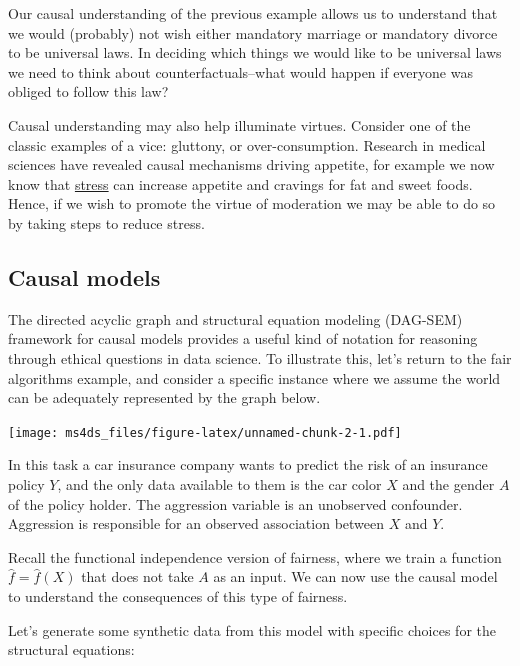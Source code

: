 \documentclass[]{book}
\theoremstyle{definition}
\theoremstyle{definition}
\theoremstyle{definition}
\theoremstyle{remark}
\begin{document}
Our causal understanding of the previous example allows us to understand
that we would (probably) not wish either mandatory marriage or mandatory
divorce to be universal laws. In deciding which things we would like to
be universal laws we need to think about counterfactuals--what would
happen if everyone was obliged to follow this law?

Causal understanding may also help illuminate virtues. Consider one of
the classic examples of a vice: gluttony, or over-consumption. Research
in medical sciences have revealed causal mechanisms driving appetite,
for example we now know that
\href{https://www.health.harvard.edu/staying-healthy/stress-and-overeating}{stress}
can increase appetite and cravings for fat and sweet foods. Hence, if we
wish to promote the virtue of moderation we may be able to do so by
taking steps to reduce stress.

\subsection{Causal models}\label{causal-models}

The directed acyclic graph and structural equation modeling (DAG-SEM)
framework for causal models provides a useful kind of notation for
reasoning through ethical questions in data science. To illustrate this,
let's return to the fair algorithms example, and consider a specific
instance where we assume the world can be adequately represented by the
graph below.

\texttt{[image: ms4ds\_files/figure-latex/unnamed-chunk-2-1.pdf]}

In this task a car insurance company wants to predict the risk of an
insurance policy \(Y\), and the only data available to them is the car
color \(X\) and the gender \(A\) of the policy holder. The aggression
variable is an unobserved confounder. Aggression is responsible for an
observed association between \(X\) and \(Y\).

Recall the functional independence version of fairness, where we train a
function \(\hat f = \hat f(X)\) that does not take \(A\) as an input. We
can now use the causal model to understand the consequences of this type
of fairness.

Let's generate some synthetic data from this model with specific choices
for the structural equations:
\end{document}
